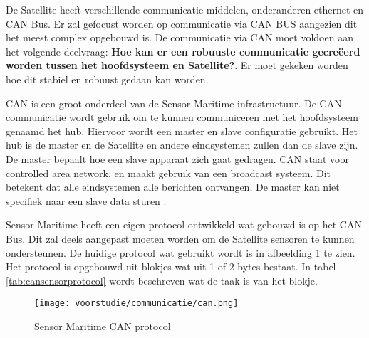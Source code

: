 De Satellite heeft verschillende communicatie middelen, onderanderen ethernet en CAN Bus. Er zal gefocust worden op communicatie via CAN BUS aangezien dit het meest complex opgebouwd is.  De communicatie via CAN moet voldoen aan het volgende deelvraag: \textbf{Hoe kan er een robuuste communicatie gecreëerd worden tussen het hoofdsysteem en Satellite?}. Er moet gekeken worden hoe dit stabiel en robuust gedaan kan worden.\newline


\noindent CAN is een groot onderdeel van de Sensor Maritime infrastructuur. De CAN communicatie wordt gebruik om te kunnen communiceren met het hoofdsysteem genaamd het hub. Hiervoor wordt een master en slave configuratie gebruikt. Het hub is de master en de Satellite en andere eindsystemen zullen dan de slave zijn. De master bepaalt hoe een slave apparaat zich gaat gedragen. CAN staat voor controlled area network, en maakt gebruik van een broadcast systeem. Dit betekent dat alle eindsystemen alle berichten ontvangen, De master kan niet specifiek naar een slave data sturen \autocite{can}. \newline

\noindent Sensor Maritime heeft een eigen protocol ontwikkeld wat gebouwd is op het CAN Bus. Dit zal deels aangepast moeten worden om de Satellite sensoren te kunnen ondersteunen. De huidige protocol wat gebruikt wordt is in afbeelding \ref{fig:canprotocol} te zien. Het protocol is opgebouwd uit blokjes wat uit 1 of 2 bytes bestaat. In tabel \ref{tab:cansensorprotocol} wordt beschreven wat de taak is van het blokje. 
\begin{figure}[h!]
	\label{fig:canprotocol}
	\caption{Sensor Maritime CAN protocol}
	\texttt{[image: voorstudie/communicatie/can.png]}
\end{figure}

